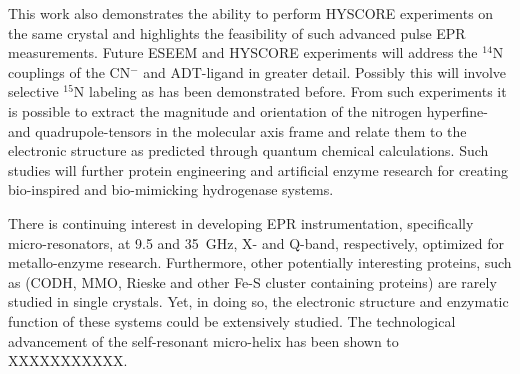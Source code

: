 This work also demonstrates the ability to perform HYSCORE experiments on the same crystal and highlights the feasibility of such advanced pulse EPR measurements. Future ESEEM and HYSCORE experiments will address the $^{14}$N couplings of the CN$^-$ and ADT-ligand in greater detail. Possibly this will involve selective $^{15}$N labeling as has been demonstrated before. \cite{Adamska2015, AdamskaBridgingAmine} From such experiments it is possible to extract the magnitude and orientation of the nitrogen hyperfine- and quadrupole-tensors in the molecular axis frame and relate them to the electronic structure as predicted through quantum chemical calculations. Such studies will further protein engineering and artificial enzyme research for creating bio-inspired and bio-mimicking hydrogenase systems. \cite{C7SE00582B}

There is continuing interest in developing EPR instrumentation, specifically micro-resonators, at 9.5 and 35~GHz, X- and Q-band, respectively, optimized for metallo-enzyme research. Furthermore, other potentially interesting proteins, such as (CODH\cite{C5CS00182J}, MMO\cite{Hoffman2014rev}, Rieske\cite{FERRARO2005175} and other Fe-S cluster containing proteins\cite{FeSClustersReview}) are rarely studied in single crystals. Yet, in doing so, the electronic structure and enzymatic function of these systems could be extensively studied. The technological advancement of the self-resonant micro-helix has been shown to XXXXXXXXXXX.


{\renewcommand{\bibsection}{\clearpage\section*{\bibname}\markboth{\bibname}{\bibname}}
\renewcommand{\bibname}{CHAPTER 6. REFERENCES}


}
